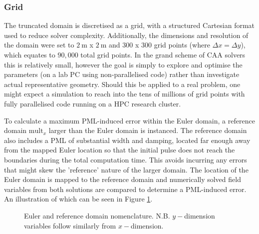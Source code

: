 \subsubsection{Grid} \label{GridSection}

The truncated domain is discretised as a grid, with a structured Cartesian format used to reduce solver complexity. Additionally, the dimensions and resolution of the domain were set to $2 \ \mathrm{m}$ x $2 \ \mathrm{m}$ and $300$ x $300$ grid points (where $\Delta x = \Delta y$), which equates to $90,000$ total grid points. In the grand scheme of CAA solvers this is relatively small, however the goal is simply to explore and optimise the parameters (on a lab PC using non-parallelised code) rather than investigate actual representative geometry. Should this be applied to a real problem, one might expect a simulation to reach into the tens of millions of grid points with fully parallelised code running on a HPC research cluster. 

To calculate a maximum PML-induced error within the Euler domain, a reference domain $\mathrm{mult}_{x}$ larger than the Euler domain is instanced. The reference domain also includes a PML of substantial width and damping, located far enough away from the mapped Euler location so that the initial pulse does not reach the boundaries during the total computation time. This avoids incurring any errors that might skew the 'reference' nature of the larger domain. The location of the Euler domain is mapped to the reference domain and numerically solved field variables from both solutions are compared to determine a PML-induced error. An illustration of which can be seen in Figure \ref{fig:REFPMLDomain}.

\begin{figure}[h!]
\centering
{}
\caption{Euler and reference domain nomenclature. N.B. $y-$dimension variables follow similarly from $x-$dimension.}
\label{fig:REFPMLDomain}
\end{figure}